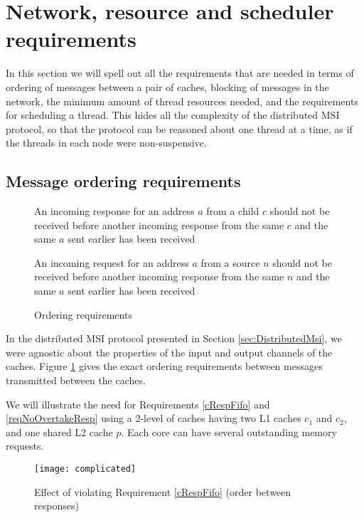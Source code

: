 \section{Network, resource and scheduler requirements}
\label{sec:network}

In this section we will spell out all the requirements that are needed in terms
of ordering of messages between a pair of caches, blocking of messages in the
network, the minimum amount of thread resources needed, and the requirements
for scheduling a thread. This hides all the complexity of the distributed MSI
protocol, so that the protocol can be reasoned about one thread at a time, as
if the threads in each node were non-suspensive.

\subsection{Message ordering requirements}

\begin{figure}\small
\begin{requirement}
An incoming response for an address $a$ from a child $c$ should not be
received before another incoming response from the same $c$ and the
same $a$ sent earlier has been received\label{cRespFifo}
\end{requirement}
\begin{requirement}
An incoming request for an address $a$ from a source $n$ should not be
received before another incoming response from the same $n$ and the
same $a$ sent earlier has been received\label{reqNoOvertakeResp}
\end{requirement}
\caption{Ordering requirements}
\label{order}
\end{figure}

In the distributed MSI protocol presented in Section
\ref{sec:DistributedMsi}, we were agnostic about the properties of the input and
output channels of the caches. Figure \ref{order} gives the exact ordering
requirements between messages transmitted between the caches.

We will illustrate the need for Requirements \ref{cRespFifo} and
\ref{reqNoOvertakeResp} using a 2-level of caches having two L1 caches $c_1$ and
$c_2$, and one shared L2 cache $p$. Each core can have several outstanding
memory requests.

\begin{figure}
\centering
\texttt{[image: complicated]}
\caption{Effect of violating Requirement \ref{cRespFifo} (order between responses)}
\label{complicated}
\end{figure}

